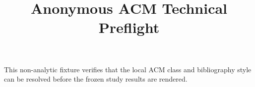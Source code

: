 \documentclass[manuscript,review,anonymous]{acmart}
\title{Anonymous ACM Technical Preflight}
\begin{document}
\maketitle
This non-analytic fixture verifies that the local ACM class and bibliography
style can be resolved before the frozen study results are rendered.

\end{document}

